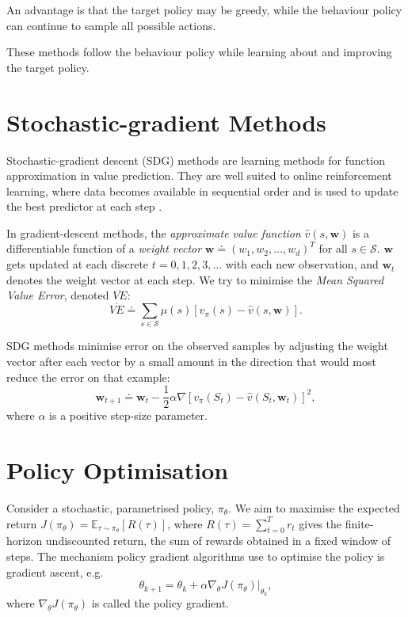 \documentclass{article}
\begin{document}
An advantage is that the target policy may be greedy, while the
behaviour policy can continue to sample all possible actions.

These methods follow the behaviour policy while learning about and
improving the target policy.

\section{Stochastic-gradient Methods}

Stochastic-gradient descent (SDG) methods are learning methods for function approximation in value prediction. They are well suited to online reinforcement learning, where data becomes available in sequential order and is used to update the best predictor at each step \cite{Mnih2015}.

In gradient-descent methods, the \textit{approximate value function} $\hat{v}(s,\mathbf{w})$ is a differentiable function of a \textit{weight vector} $\mathbf{w} \doteq (w_1, w_2, \dots, w_d)^T$ for all $s \in \mathcal{S}$. $\mathbf{w}$ gets updated at each discrete $t = 0, 1, 2, 3, \dots$ with each new observation, and $\mathbf{w}_t$ denotes the weight vector at each step. We try to minimise the \textit{Mean Squared Value Error}, denoted $\overline{VE}$: $$\overline{VE} \doteq \sum_{s \in \mathcal{S}} \mu(s) \left[ v_\pi(s) - \hat{v}(s, \mathbf{w})\right].$$

SDG methods minimise error on the observed samples by adjusting the weight vector after each vector by a small amount in the direction that would most reduce the error on that example: $$\mathbf{w}_{t+1} \doteq \mathbf{w}_t - \frac{1}{2} \alpha \nabla \left[ v_\pi(S_t) - \hat{v}(S_t, \mathbf{w}_t)\right]^2,$$ where $\alpha$ is a positive step-size parameter.

\section{Policy Optimisation}

Consider a stochastic, parametrised policy, $\pi_\theta$. We aim to maximise the expected return $J(\pi_\theta) = \mathbb{E}_{\tau \sim \pi_\theta} \left[ R(\tau) \right]$, where $R(\tau) = \sum_{t=0}^Tr_t$ gives the finite-horizon undiscounted return, the sum of rewards obtained in a fixed window of steps. The mechanism policy gradient algorithms use to optimise the policy is gradient ascent, e.g. $$\theta_{k+1} = \theta_k + \alpha \nabla_\theta J(\pi_\theta) |_{\theta_k},$$ where $\nabla_\theta J(\pi_\theta)$ is called the policy gradient.
\end{document}
